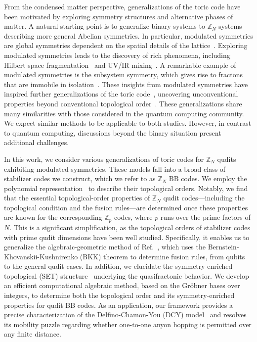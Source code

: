 \documentclass[aps,prb,english,superscriptaddress,twocolumn,tightenlines,showpacs,longbibliography,floatfix,amsfonts]{revtex4-2}
\begin{document}
From the condensed matter perspective, generalizations of the toric code have been motivated by exploring symmetry structures and alternative phases of matter. A natural starting point is to generalize binary systems to $\mathbb{Z}_{N}$ systems describing more general Abelian symmetries. In particular, modulated symmetries are global symmetries dependent on the spatial details of the lattice~\cite{Sala2022, Watanabe2023, Delfino2023_2, Delfino2024, Sala2024, Han2024, Hiromi2024_1, Hiromi2024_2, Pace2025, Yoshitome2025, Kim2025_1, Kim2025_2}. Exploring modulated symmetries leads to the discovery of rich phenomena, including Hilbert space fragmentation~\cite{Sala2020, Khemani2020, Moudgalya2020} and UV/IR mixing~\cite{Oh2022_1, Oh2022_2, Gorantla2021, Gorantla2022, Pace2022, Casasola2024, Kim2025_3}. A remarkable example of modulated symmetries is the subsystem symmetry, which gives rise to fractons that are immobile in isolation~\cite{Chamon2005, Bravyi2011, Haah2011, Yoshida2013, Vijay2015, Vijay2016, Williamson2016, Pretko2017, Ma2017, Shirley2019, Nandkishore2019, Pretko2020, Song2019, Prem2019, Devakul2019, Song2022, Song2024, Canossa2024, Zhang2025}. These insights from modulated symmetries have inspired further generalizations of the toric code~\cite{Watanabe2023, Delfino2023_2, Delfino2024}, uncovering unconventional properties beyond conventional topological order~\cite{Delfino2023, Chen2025}. These generalizations share many similarities with those considered in the quantum computing community. We expect similar methods to be applicable to both studies. However, in contrast to quantum computing, discussions beyond the binary situation present additional challenges. 
  
In this work, we consider various generalizations of toric codes for $\mathbb{Z}_N$ qudits exhibiting modulated symmetries. These models fall into a broad class of stabilizer codes we construct, which we refer to as $\mathbb{Z}_N$ BB codes. We employ the polynomial representation~\cite{Haah2013} to describe their topological orders. Notably, we find that the essential topological-order properties of $\mathbb{Z}_N$ qudit codes—including the topological condition and the fusion rules—are determined once these properties are known for the corresponding $\mathbb{Z}_p$ codes, where $p$ runs over the prime factors of $N$. This is a significant simplification, as the topological orders of stabilizer codes with prime qudit dimensions have been well studied. Specifically, it enables us to generalize the algebraic-geometric method of Ref.~\cite{Chen2025}, which uses the Bernstein-Khovanskii-Kushnirenko (BKK) theorem to determine fusion rules, from qubits to the general qudit cases. In addition, we elucidate the symmetry-enriched topological (SET) structure~\cite{Essin2013, Mesaros2013, Huang2014, Chiu2016, Barkeshli2019} underlying the quasifractonic behavior. We develop an efficient computational algebraic method, based on the Gr\"{o}bner bases over integers, to determine both the topological order and its symmetry-enriched properties for qudit BB codes. As an application, our framework provides a precise characterization of the Delfino-Chamon-You (DCY) model~\cite{Delfino2023_2} and resolves its mobility puzzle regarding whether one-to-one anyon hopping is permitted over any finite distance.
  
\end{document}
